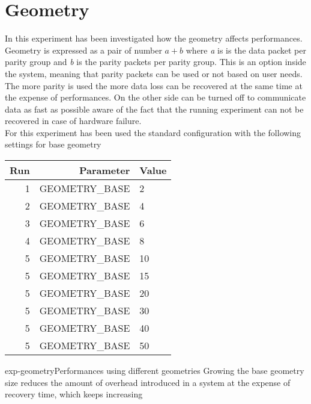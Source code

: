 \section{Geometry}
In this experiment has been investigated how the geometry affects performances.
Geometry is expressed as a pair of number $a+b$ where \textit{a} is is the data
packet per parity group and \textit{b} is the parity packets per parity group.
This is an option inside the system, meaning that parity packets can be used or
not based on user needs. The more parity is used the more data loss can be
recovered at the same time at the expense of performances. On the other side can
be turned off to communicate data as fast as possible aware of the fact that the
running experiment can not be recovered in case of hardware failure.\\
For this experiment has been used the standard configuration with the following
settings for base geometry \\
\begin{tabular}{r |r | l}
    \textbf{Run} & \textbf{Parameter} & \textbf{Value} \\\hline
    1 & GEOMETRY\_BASE & 2 \\
    2 & GEOMETRY\_BASE & 4 \\
    3 & GEOMETRY\_BASE & 6 \\
    4 & GEOMETRY\_BASE & 8 \\
    5 & GEOMETRY\_BASE & 10 \\
    5 & GEOMETRY\_BASE & 15 \\
    5 & GEOMETRY\_BASE & 20 \\
    5 & GEOMETRY\_BASE & 30 \\
    5 & GEOMETRY\_BASE & 40 \\
    5 & GEOMETRY\_BASE & 50 \\
\end{tabular}

\begin{myimage}{exp-geometry}{Performances using different geometries}
    Growing the base geometry size reduces the amount of overhead introduced in
    a system at the expense of recovery time, which keeps increasing
\end{myimage}

